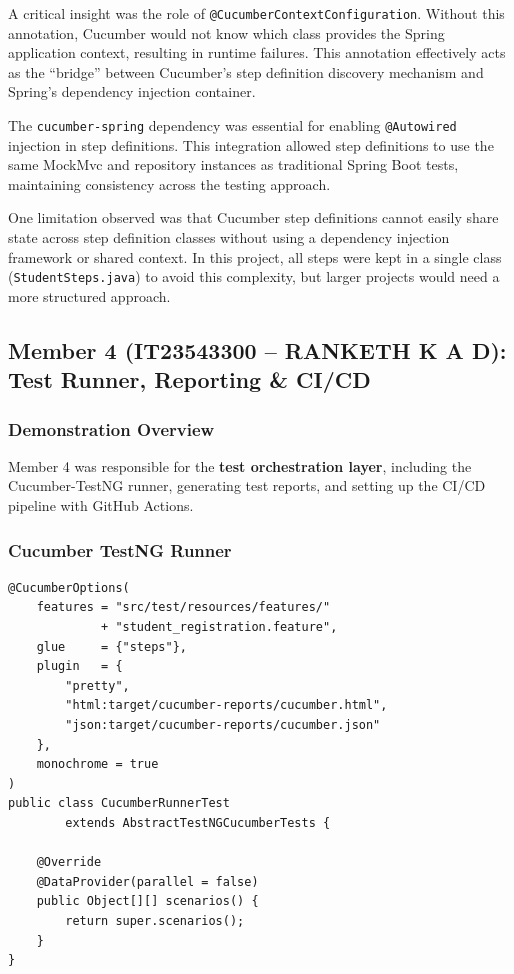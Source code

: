 \documentclass[12pt,a4paper]{article}
\begin{document}
A critical insight was the role of \texttt{@CucumberContextConfiguration}. Without this annotation, Cucumber would not know which class provides the Spring application context, resulting in runtime failures. This annotation effectively acts as the ``bridge'' between Cucumber's step definition discovery mechanism and Spring's dependency injection container.

The \texttt{cucumber-spring} dependency was essential for enabling \texttt{@Autowired} injection in step definitions. This integration allowed step definitions to use the same MockMvc and repository instances as traditional Spring Boot tests, maintaining consistency across the testing approach.

One limitation observed was that Cucumber step definitions cannot easily share state across step definition classes without using a dependency injection framework or shared context. In this project, all steps were kept in a single class (\texttt{StudentSteps.java}) to avoid this complexity, but larger projects would need a more structured approach.

\subsection{Member 4 (IT23543300 -- RANKETH K A D): Test Runner, Reporting \& CI/CD}

\subsubsection{Demonstration Overview}

Member 4 was responsible for the \textbf{test orchestration layer}, including the Cucumber-TestNG runner, generating test reports, and setting up the CI/CD pipeline with GitHub Actions.

\subsubsection{Cucumber TestNG Runner}

\begin{lstlisting}[style=javastyle, caption={Cucumber TestNG runner -- \texttt{CucumberRunnerTest.java}}]
@CucumberOptions(
    features = "src/test/resources/features/"
             + "student_registration.feature",
    glue     = {"steps"},
    plugin   = {
        "pretty",
        "html:target/cucumber-reports/cucumber.html",
        "json:target/cucumber-reports/cucumber.json"
    },
    monochrome = true
)
public class CucumberRunnerTest
        extends AbstractTestNGCucumberTests {

    @Override
    @DataProvider(parallel = false)
    public Object[][] scenarios() {
        return super.scenarios();
    }
}
\end{lstlisting}
\end{document}
